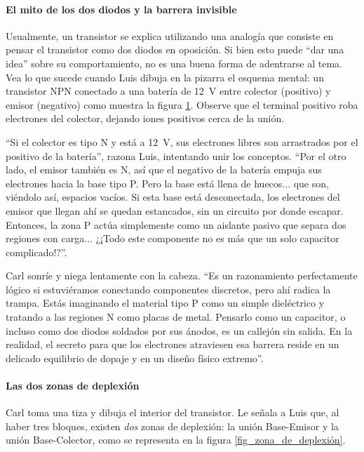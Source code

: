 \paragraph{El mito de los dos diodos y la barrera invisible} Usualmente, un transistor se explica utilizando una analogía que consiste en pensar el transistor como dos diodos en oposición. Si bien esto puede ``dar una idea'' sobre su comportamiento, no es una buena forma de adentrarse al tema. Vea lo que sucede cuando Luis dibuja en la pizarra el esquema mental: un transistor NPN conectado a una batería de \qty{12}{\volt} entre colector (positivo) y emisor (negativo) como muestra la figura \ref{fig_npn_no_polarizado}. Observe que el terminal positivo roba electrones del colector, dejando iones positivos cerca de la unión. 
\begin{figure}[!ht]
  \centering
  
  \caption{}
  \label{fig_npn_no_polarizado}
\end{figure}

``Si el colector es tipo N y está a \qty{12}{\volt}, sus electrones libres son arrastrados por el positivo de la batería'', razona Luis, intentando unir los conceptos. ``Por el otro lado, el emisor también es N, así que el negativo de la batería empuja sus electrones hacia la base tipo P. Pero la base está llena de huecos... que son, viéndolo así, espacios vacíos. Si esta base está desconectada, los electrones del emisor que llegan ahí se quedan estancados, sin un circuito por donde escapar. Entonces, la zona P actúa simplemente como un aislante pasivo que separa dos regiones con carga... ¿¡Todo este componente no es más que un solo capacitor complicado!?''.

Carl sonríe y niega lentamente con la cabeza. ``Es un razonamiento perfectamente lógico si estuviéramos conectando componentes discretos, pero ahí radica la trampa. Estás imaginando el material tipo P como un simple dieléctrico y tratando a las regiones N como placas de metal. Pensarlo como un capacitor, o incluso como dos diodos soldados por sus ánodos, es un callejón sin salida. En la realidad, el secreto para que los electrones atraviesen esa barrera reside en un delicado equilibrio de dopaje y en un diseño físico extremo''.

\paragraph{Las dos zonas de deplexión}
Carl toma una tiza y dibuja el interior del transistor. Le señala a Luis que, al haber tres bloques, existen \emph{dos} zonas de deplexión: la unión Base-Emisor y la unión Base-Colector, como se representa en la figura \ref{fig_zona_de_deplexión}. 

